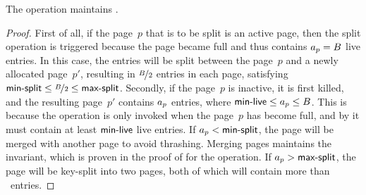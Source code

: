 \thmskip
\begin{lemma}
\label{lemma:split-page-split-counts}
The  operation maintains
.
\end{lemma}
\begin{proof}
First of all, if the page~$p$ that is to be split is an active page, then 
the split operation is triggered because the page became full and thus
contains $a_{p} = B$ live entries.
In this case, the entries will be split between the page~$p$ and a newly
allocated page~$p'$, resulting in $\nicefrac{B}{2}$ entries in each
page, satisfying $\text{\textsf{min-split}} \leq \nicefrac{B}{2} \leq \text{\textsf{max-split}}$. 
Secondly, if the page~$p$ is inactive, it is first killed, and the resulting
page~$p'$ contains $a_{p}$ entries, where $\text{\textsf{min-live}} \leq
a_{p} \leq B$. 
This is because the  operation is only invoked when the
page~$p$ has become full, and by  it must
contain at least $\text{\textsf{min-live}}$ live entries.
If $a_{p} < \text{\textsf{min-split}}$, the page will be merged with another page
to avoid thrashing. 
Merging pages maintains the invariant, which is proven in the proof of
 for the  operation.
If $a_{p} > \text{\textsf{max-split}}$, the page will be key-split into two pages,
both of which will contain more than \minsplit\ entries. 
\end{proof}
\thmskip


